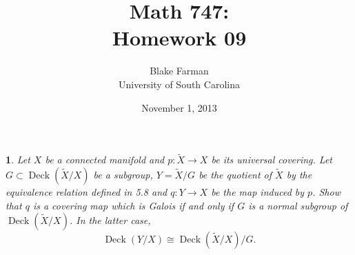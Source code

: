\documentclass[10pt]{amsart}
\author{Blake Farman\\University of South Carolina}
\title{Math 747:\\Homework 09}
\date{November 1, 2013}
\begin{document}
\maketitle

\providecommand{\p}{\mathfrak{p}}
\providecommand{\m}{\mathfrak{m}}
\providecommand{\Deck}[1]{\operatorname{Deck}\left(#1\right)}

\newtheorem{thm}{}
\newtheorem{lem}{Lemma}
\newtheorem{prop}{Proposition}
\theoremstyle{definition}
\newtheorem{defn}{Definition}[thm]

\newcommand{\A}{\mathbb{A}}

\begin{thm}
  Let $X$ be a connected manifold and $p \colon \tilde{X} \rightarrow X$ be its universal covering.
  Let $G \subset \Deck{\tilde{X}/X}$ be a subgroup, $Y = \tilde{X}/G$ be the quotient of $\tilde{X}$ by the equivalence relation defined in 5.8 and $q \colon Y \rightarrow X$ be the map induced by $p$.
  Show that $q$ is a covering map which is Galois if and only if $G$ is a normal subgroup of $\Deck{\tilde{X}/X}$.
  In the latter case,
  $$\Deck{Y/X} \cong \Deck{\tilde{X}/X}/G.$$
  

\end{thm}
\end{document}
